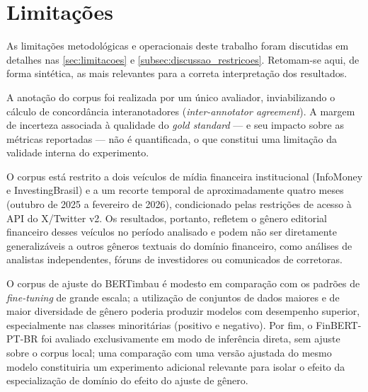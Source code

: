 
\section{Limitações}
\label{sec:limitacoes_conclusao}

As limitações metodológicas e operacionais deste trabalho foram discutidas em detalhes nas \autoref{sec:limitacoes} e \autoref{subsec:discussao_restricoes}. Retomam-se aqui, de forma sintética, as mais relevantes para a correta interpretação dos resultados.

A anotação do corpus foi realizada por um único avaliador, inviabilizando o cálculo de concordância interanotadores (\textit{inter-annotator agreement}). A margem de incerteza associada à qualidade do \textit{gold standard} --- e seu impacto sobre as métricas reportadas --- não é quantificada, o que constitui uma limitação da validade interna do experimento.

O corpus está restrito a dois veículos de mídia financeira institucional (InfoMoney e InvestingBrasil) e a um recorte temporal de aproximadamente quatro meses (outubro de 2025 a fevereiro de 2026), condicionado pelas restrições de acesso à API do X/Twitter v2. Os resultados, portanto, refletem o gênero editorial financeiro desses veículos no período analisado e podem não ser diretamente generalizáveis a outros gêneros textuais do domínio financeiro, como análises de analistas independentes, fóruns de investidores ou comunicados de corretoras.

O corpus de ajuste do BERTimbau é modesto em comparação com os padrões de \textit{fine-tuning} de grande escala; a utilização de conjuntos de dados maiores e de maior diversidade de gênero poderia produzir modelos com desempenho superior, especialmente nas classes minoritárias (positivo e negativo). Por fim, o FinBERT-PT-BR foi avaliado exclusivamente em modo de inferência direta, sem ajuste sobre o corpus local; uma comparação com uma versão ajustada do mesmo modelo constituiria um experimento adicional relevante para isolar o efeito da especialização de domínio do efeito do ajuste de gênero.